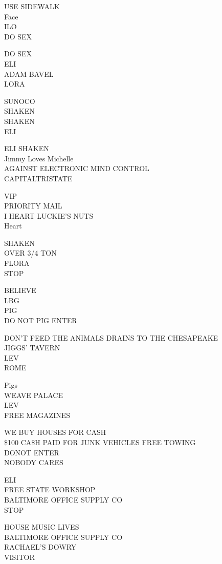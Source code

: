 \documentclass[10pt,letterpaper]{article}
\begin{document}
USE SIDEWALK\\
Face\\
ILO\\
DO SEX

DO SEX\\
ELI\\
ADAM BAVEL\\
LORA

SUNOCO\\
SHAKEN\\
SHAKEN\\
ELI

ELI SHAKEN\\
Jimmy Loves Michelle\\
AGAINST ELECTRONIC MIND CONTROL\\
CAPITALTRISTATE

VIP\\
PRIORITY MAIL\\
I HEART LUCKIE'S NUTS\\
Heart

SHAKEN\\
OVER 3/4 TON\\
FLORA\\
STOP

BELIEVE\\
LBG\\
PIG\\
DO NOT PIG ENTER

DON'T FEED THE ANIMALS DRAINS TO THE CHESAPEAKE\\
JIGGS' TAVERN\\
LEV\\
ROME

Pigs\\
WEAVE PALACE\\
LEV\\
FREE MAGAZINES

WE BUY HOUSES FOR CASH\\
\$100 CA\$H PAID FOR JUNK VEHICLES FREE TOWING\\
DONOT ENTER\\
NOBODY CARES

ELI\\
FREE STATE WORKSHOP\\
BALTIMORE OFFICE SUPPLY CO\\
STOP

HOUSE MUSIC LIVES\\
BALTIMORE OFFICE SUPPLY CO\\
RACHAEL'S DOWRY\\
VISITOR
\end{document}
